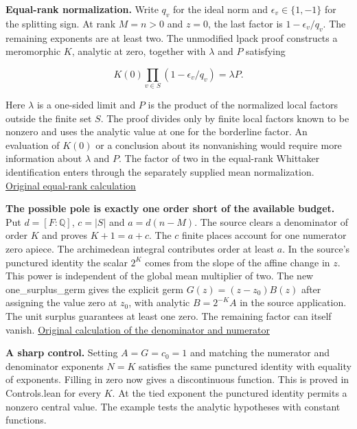 \documentclass[11pt,letterpaper]{article}
\begin{document}
\textbf{Equal-rank normalization.} Write \(q_v\) for the ideal norm and \(\epsilon_v\in\{1,-1\}\) for the splitting sign. At rank \(M=n>0\) and \(z=0\), the last factor is \(1-\epsilon_v/q_v\). The remaining exponents are at least two. The unmodified {\ttfamily\small lpack} proof constructs a meromorphic \(K\), analytic at zero, together with \(\lambda\) and \(P\) satisfying

\[K(0)\prod_{v\in S}(1-\epsilon_v/q_v)=\lambda P .\]

Here \(\lambda\) is a one-sided limit and \(P\) is the product of the normalized local factors outside the finite set \(S\). The proof divides only by finite local factors known to be nonzero and uses the analytic value at one for the borderline factor. An evaluation of \(K(0)\) or a conclusion about its nonvanishing would require more information about \(\lambda\) and \(P\). The factor of two in the equal-rank Whittaker identification enters through the separately supplied mean normalization. \href{https://github.com/nousentllc/riemann-hypothesis/blob/40e56bab026552e089d7afcfeff08d2defb9c005/src/Development/WeilBound/CoreStatements/AutomorphicKernels/SiegelWeilFormula/WhittakerEqualRank/WqMain.lean\#L64-L90}{Original equal-rank calculation}

\textbf{The possible pole is exactly one order short of the available budget.} Put \(d=[F:\mathbb Q]\), \(c=|S|\) and \(a=d(n-M)\). The source clears a denominator of order \(K\) and proves \(K+1=a+c\). The \(c\) finite places account for one numerator zero apiece. The archimedean integral contributes order at least \(a\). In the source's punctured identity the scalar \(2^K\) comes from the slope of the affine change in \(z\). This power is independent of the global mean multiplier of two. The new {\ttfamily\small one\_\allowbreak{}surplus\_\allowbreak{}germ} gives the explicit germ \(G(z)=(z-z_0)B(z)\) after assigning the value zero at \(z_0\), with analytic \(B=2^{-K}A\) in the source application. The unit surplus guarantees at least one zero. The remaining factor can itself vanish. \href{https://github.com/nousentllc/riemann-hypothesis/blob/40e56bab026552e089d7afcfeff08d2defb9c005/src/Development/WeilBound/CoreStatements/AutomorphicKernels/SiegelWeilFormula/WhittakerLowRank/WhitGenLowOf.lean\#L108-L157}{Original calculation of the denominator and numerator}

\textbf{A sharp control.} Setting \(A=G=c_0=1\) and matching the numerator and denominator exponents \(N=K\) satisfies the same punctured identity with equality of exponents. Filling in zero now gives a discontinuous function. This is proved in {\ttfamily\small Controls.\allowbreak{}lean} for every \(K\). At the tied exponent the punctured identity permits a nonzero central value. The example tests the analytic hypotheses with constant functions.
\end{document}
